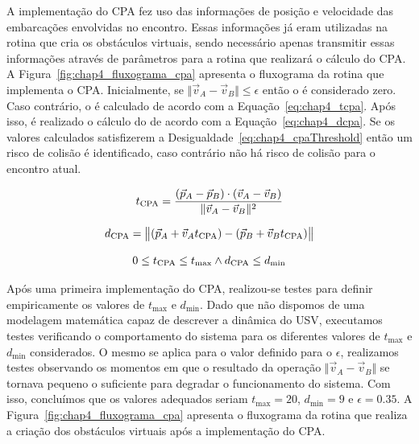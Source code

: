     A implementação do CPA fez uso das informações de posição e velocidade das embarcações envolvidas no encontro. Essas informações já eram utilizadas na rotina que cria os obstáculos virtuais, sendo necessário apenas transmitir essas informações através de parâmetros para a rotina que realizará o cálculo do CPA. A Figura~\ref{fig:chap4_fluxograma_cpa} apresenta o fluxograma da rotina que implementa o CPA. 
    Inicialmente, se $\Vert\vec{v}_{A}-\vec{v}_{B}\Vert\leq\epsilon$ então o \tcpa é considerado zero. Caso contrário, o \tcpa é calculado de acordo com a Equação~\ref{eq:chap4_tcpa}. Após isso, é realizado o cálculo do \dcpa de acordo com a Equação~\ref{eq:chap4_dcpa}. Se os valores calculados satisfizerem a Desigualdade~\ref{eq:chap4_cpaThreshold} então um risco de colisão é identificado, caso contrário não há risco de colisão para o encontro atual.
    
    \begin{equation}
        t_{\rm CPA} = \frac{(\vec{p}_{A}-\vec{p}_{B})\cdot(\vec{v}_{A}-\vec{v}_{B})}{\Vert\vec{v}_{A}-\vec{v}_{B}\Vert^{2}}
        \label{eq:chap4_tcpa}
    \end{equation}
    
    \begin{equation}
        d_{\rm CPA} =\bigl\Vert (\vec{p}_{A}+\vec{v}_{A}t_{\rm CPA})-(\vec{p}_{B}+\vec{v}_{B}t_{\rm CPA})\bigr\Vert
        \label{eq:chap4_dcpa}
    \end{equation}
        
    \begin{equation}
        0\leq t_{\rm CPA}\leq t_{\max} \land d_{\rm CPA}\leq d_{\min}
        \label{eq:chap4_cpaThreshold}
    \end{equation}
    
    Após uma primeira implementação do CPA, realizou-se testes para definir empiricamente os valores de $t_{\max}$ e $d_{\min}$. Dado que não dispomos de uma modelagem matemática capaz de descrever a dinâmica do USV, executamos testes verificando o comportamento do sistema para os diferentes valores de $t_{\max}$ e $d_{\min}$ considerados. O mesmo se aplica para o valor definido para o $\epsilon$, realizamos testes observando os momentos em que o resultado da operação $\Vert\vec{v}_{A}-\vec{v}_{B}\Vert$ se tornava pequeno o suficiente para degradar o funcionamento do sistema. Com isso, concluímos que os valores adequados seriam $t_{\max} = 20$, $d_{\min} = 9$ e $\epsilon = 0.35$. A Figura~\ref{fig:chap4_fluxograma_cpa} apresenta o fluxograma da rotina que realiza a criação dos obstáculos virtuais após a implementação do CPA.
    
